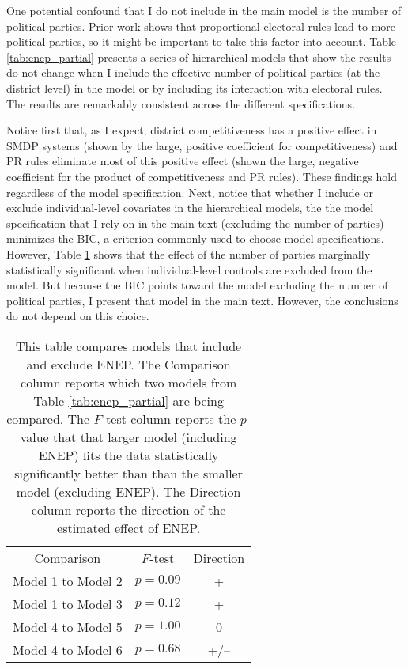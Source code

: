 \documentclass[12pt]{article}
\begin{document}
\begin{appendix}
One potential confound that I do not include in the main model is the number of political parties. Prior work shows that proportional electoral rules lead to more political parties, so it might be important to take this factor into account. Table \ref{tab:enep_partial} presents a series of hierarchical models that show the results do not change when I  include the effective number of political parties (at the district level) in the model or by including its interaction with electoral rules. The results are remarkably consistent across the different specifications.

Notice first that, as I expect, district competitiveness has a positive effect in SMDP systems (shown by the large, positive coefficient for competitiveness) and PR rules eliminate most of this positive effect (shown the large, negative coefficient for the product of competitiveness and PR rules). These findings hold regardless of the model specification. Next, notice that whether I include or exclude individual-level covariates in the hierarchical  models, the the model specification that I rely on in the main text (excluding the number of parties) minimizes the BIC, a criterion commonly used to choose model specifications. However, Table \ref{tab:F_partial} shows that the effect of the number of parties marginally statistically significant when individual-level controls are excluded from the model. But because the BIC points toward the model excluding the number of political parties, I present that model in the main text. However, the conclusions do not depend on this choice.



 
 \begin{table}[h!]
 \begin{center}
 \begin{tabular}{c c c}
 Comparison & $F$-test & Direction \\
 Model 1 to Model 2 & $p = 0.09$ & + \\
 Model 1 to Model 3 & $p = 0.12$ & + \\
 Model 4 to Model 5 & $p = 1.00$ & 0 \\
 Model 4 to Model 6 & $p = 0.68$ & +/-- \\
 \end{tabular} \caption{This table compares models that include and exclude ENEP. The Comparison column reports which two models from Table \ref{tab:enep_partial} are being compared. The $F$-test column reports the $p$-value that that larger model (including ENEP) fits the data statistically significantly better than than the smaller model (excluding ENEP). The Direction column reports the direction of the estimated effect of ENEP.}\label{tab:F_partial}
 \end{center}
 \end{table}
 

\end{appendix}
\end{document}
